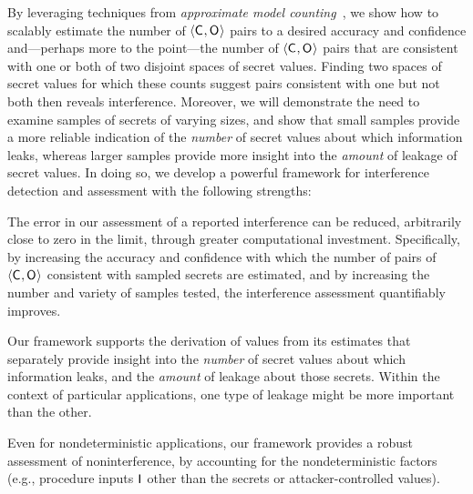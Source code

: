 By leveraging techniques from \textit{approximate model
counting}~\cite{Chakraborty:2013:SAM:2961240.2961265}, we show how to
scalably estimate the number of $\langle\mathsf{C}_{},\mathsf{O}_{}\rangle$
pairs to a desired accuracy and confidence and---perhaps more to the
point---the number of $\langle\mathsf{C}_{},\mathsf{O}_{}\rangle$ pairs that are
consistent with one or both of two disjoint spaces of secret values.
Finding two spaces of secret values for which these counts suggest
pairs consistent with one but not both then reveals interference.
Moreover, we will demonstrate the need to examine samples of secrets
of varying sizes, and show that small samples provide a more reliable
indication of the \textit{number} of secret values about which
information leaks, whereas larger samples provide more insight into
the \textit{amount} of leakage of secret values.  In doing so, we
develop a powerful framework for interference detection and assessment
with the following strengths:
\begin{compactitem}
\item The error in our assessment of a reported interference can be
reduced, arbitrarily close to zero in the limit, through greater
computational investment.  Specifically, by increasing the accuracy
and confidence with which the number of pairs of
$\langle\mathsf{C}_{},\mathsf{O}_{}\rangle$ consistent with sampled secrets are
estimated, and by increasing the number and variety of samples tested,
the interference assessment quantifiably improves.

\item Our framework supports the derivation of values from its
estimates that separately provide insight into the \textit{number} of
secret values about which information leaks, and the \textit{amount}
of leakage about those secrets.  Within the context of particular
applications, one type of leakage might be more important than the
other.

\item Even for nondeterministic applications, our framework provides a
robust assessment of noninterference, by accounting for the
nondeterministic factors (e.g., procedure inputs $\mathsf{I}_{}$ other than
the secrets or attacker-controlled values).
\end{compactitem}

